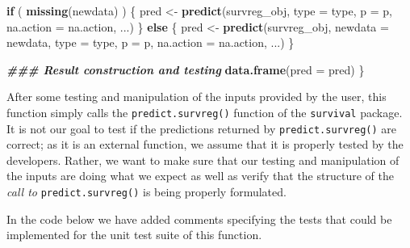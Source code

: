 \documentclass[
]{book}
\newenvironment{Shaded}{\begin{snugshade}}{\end{snugshade}}
\newcommand{\AttributeTok}[1]{\textcolor[rgb]{0.13,0.29,0.53}{#1}}
\newcommand{\ControlFlowTok}[1]{\textcolor[rgb]{0.13,0.29,0.53}{\textbf{#1}}}
\newcommand{\DocumentationTok}[1]{\textcolor[rgb]{0.56,0.35,0.01}{\textbf{\textit{#1}}}}
\newcommand{\FunctionTok}[1]{\textcolor[rgb]{0.13,0.29,0.53}{\textbf{#1}}}
\newcommand{\NormalTok}[1]{#1}
\newcommand{\OtherTok}[1]{\textcolor[rgb]{0.56,0.35,0.01}{#1}}
\begin{document}
\begin{Shaded}
\begin{Highlighting}[]
  \ControlFlowTok{if}\NormalTok{ ( }\FunctionTok{missing}\NormalTok{(newdata) ) \{}
\NormalTok{    pred }\OtherTok{\textless{}{-}} \FunctionTok{predict}\NormalTok{(survreg\_obj, }\AttributeTok{type =}\NormalTok{ type, }\AttributeTok{p =}\NormalTok{ p, }\AttributeTok{na.action =}\NormalTok{ na.action, ...)}
\NormalTok{  \} }\ControlFlowTok{else}\NormalTok{ \{}
\NormalTok{    pred }\OtherTok{\textless{}{-}} \FunctionTok{predict}\NormalTok{(survreg\_obj, }\AttributeTok{newdata =}\NormalTok{ newdata, }\AttributeTok{type =}\NormalTok{ type, }\AttributeTok{p =}\NormalTok{ p, }
                    \AttributeTok{na.action =}\NormalTok{ na.action, ...)}
\NormalTok{  \}}

  \DocumentationTok{\#\#\# Result construction and testing}
  \FunctionTok{data.frame}\NormalTok{(}\AttributeTok{pred =}\NormalTok{ pred)}
\NormalTok{\}}
\end{Highlighting}
\end{Shaded}

After some testing and manipulation of the inputs provided by the user, this function simply calls the \texttt{predict.survreg()} function of the \texttt{survival} package. It is not our goal to test if the predictions returned by \texttt{predict.survreg()} are correct; as it is an external function, we assume that it is properly tested by the developers. Rather, we want to make sure that our testing and manipulation of the inputs are doing what we expect as well as verify that the structure of the \emph{call to} \texttt{predict.survreg()} is being properly formulated.

In the code below we have added comments specifying the tests that could be implemented for the unit test suite of this function.
\end{document}
